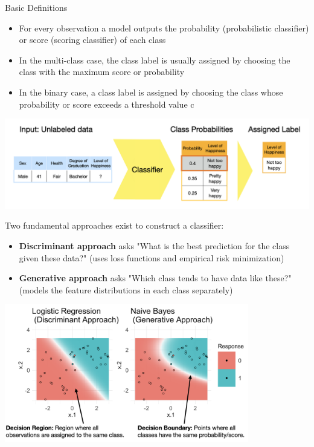 \documentclass[11pt,compress,t,notes=noshow, xcolor=table]{beamer}
\begin{document}
\begin{vbframe}{Basic Definitions}
\begin{itemize}
\item \small For every observation a model outputs the probability (probabilistic classifier) or score (scoring classifier) of each class
\item \small In the multi-class case, the class label is usually assigned by choosing the class with the maximum score or probability
\item \small In the binary case, a class label is assigned by choosing the class whose probability or score exceeds a threshold value c
\end{itemize}

\vspace{5mm}

\begin{center}
  \includegraphics[width = \textwidth]{slides/supervised-classification/figure_man/nutshell-classification-label-assignment.png}
\end{center}

Two fundamental approaches exist to construct a classifier:
\begin{itemize}
\item \small \textbf{Discriminant approach} asks "What is the best prediction for the class given these data?" (uses loss functions and empirical risk minimization)
\item \small \textbf{Generative approach} asks "Which class tends to have data like these?" (models the feature distributions in each class separately)

\end{itemize}

\begin{center}
  \includegraphics[width = 0.8\textwidth]{slides/supervised-classification/figure_man/nutshell_classif_binary_task.png}
\end{center}
\end{vbframe}
\end{document}
